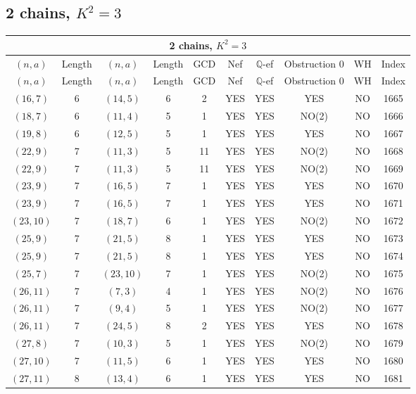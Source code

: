 \subsection{2 chains, $K^2 = 3$}
\begin{longtable}{|c|c|c|c|c|c|c|c|c|c|}
\hline
\multicolumn{10}{|c|}{2 chains, $K^2 = 3$}\\
\hline
$(n,a)$ & Length & $(n,a)$ & Length & GCD & Nef & $\mathbb Q$-ef & Obstruction 0 & WH & Index\\
\hline
\endfirsthead

\hline
$(n,a)$ & Length & $(n,a)$ & Length & GCD & Nef & $\mathbb Q$-ef & Obstruction 0 & WH & Index\\
\hline
\endhead
\hline
\endfoot

$(16, 7)$ & 6 & $(14, 5)$ & 6 & 2 & YES & YES & YES & NO & 1665\\
$(18, 7)$ & 6 & $(11, 4)$ & 5 & 1 & YES & YES & NO(2) & NO & 1666\\
$(19, 8)$ & 6 & $(12, 5)$ & 5 & 1 & YES & YES & YES & NO & 1667\\
$(22, 9)$ & 7 & $(11, 3)$ & 5 & 11 & YES & YES & NO(2) & NO & 1668\\
$(22, 9)$ & 7 & $(11, 3)$ & 5 & 11 & YES & YES & NO(2) & NO & 1669\\
$(23, 9)$ & 7 & $(16, 5)$ & 7 & 1 & YES & YES & YES & NO & 1670\\
$(23, 9)$ & 7 & $(16, 5)$ & 7 & 1 & YES & YES & YES & NO & 1671\\
$(23, 10)$ & 7 & $(18, 7)$ & 6 & 1 & YES & YES & NO(2) & NO & 1672\\
$(25, 9)$ & 7 & $(21, 5)$ & 8 & 1 & YES & YES & YES & NO & 1673\\
$(25, 9)$ & 7 & $(21, 5)$ & 8 & 1 & YES & YES & YES & NO & 1674\\
$(25, 7)$ & 7 & $(23, 10)$ & 7 & 1 & YES & YES & NO(2) & NO & 1675\\
$(26, 11)$ & 7 & $(7, 3)$ & 4 & 1 & YES & YES & NO(2) & NO & 1676\\
$(26, 11)$ & 7 & $(9, 4)$ & 5 & 1 & YES & YES & NO(2) & NO & 1677\\
$(26, 11)$ & 7 & $(24, 5)$ & 8 & 2 & YES & YES & YES & NO & 1678\\
$(27, 8)$ & 7 & $(10, 3)$ & 5 & 1 & YES & YES & NO(2) & NO & 1679\\
$(27, 10)$ & 7 & $(11, 5)$ & 6 & 1 & YES & YES & YES & NO & 1680\\
$(27, 11)$ & 8 & $(13, 4)$ & 6 & 1 & YES & YES & YES & NO & 1681\\

\end{longtable}
